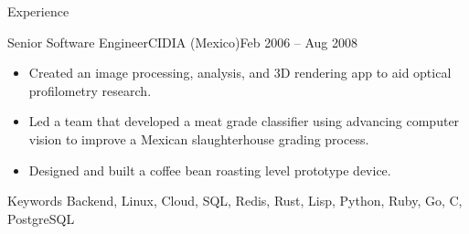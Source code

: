 \documentclass[colibri]{mcdowellcv}
\begin{document}
\begin{cvsection}{Experience}
\begin{cvsubsection}{Senior Software Engineer}{CIDIA (Mexico)}{Feb 2006 -- Aug 2008}
		\begin{itemize}
    \item
      Created an image processing, analysis, and 3D rendering app to aid optical
      profilometry research.
    \item
      Led a team that developed a meat grade classifier using advancing computer
      vision to improve a Mexican slaughterhouse grading process.
    \item
      Designed and built a coffee bean roasting level prototype device.
		\end{itemize}
	\end{cvsubsection}
  \begin{cvsubsection}{Keywords}{}{}
    Backend, Linux, Cloud, SQL, Redis, Rust, Lisp, Python, Ruby, Go, C, PostgreSQL
  \end{cvsubsection}
\end{cvsection}
\end{document}
